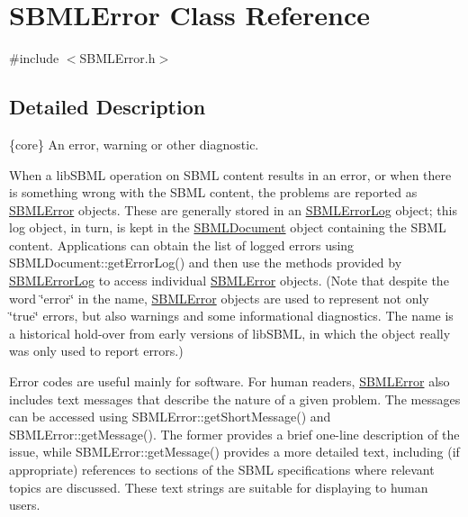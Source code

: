 \hypertarget{class_s_b_m_l_error}{}\section{S\+B\+M\+L\+Error Class Reference}
\label{class_s_b_m_l_error}


{\ttfamily \#include $<$S\+B\+M\+L\+Error.\+h$>$}



\subsection{Detailed Description}
\{core\} An error, warning or other diagnostic.



When a lib\+S\+B\+ML operation on S\+B\+ML content results in an error, or when there is something wrong with the S\+B\+ML content, the problems are reported as \hyperlink{class_s_b_m_l_error}{S\+B\+M\+L\+Error} objects. These are generally stored in an \hyperlink{class_s_b_m_l_error_log}{S\+B\+M\+L\+Error\+Log} object; this log object, in turn, is kept in the \hyperlink{class_s_b_m_l_document}{S\+B\+M\+L\+Document} object containing the S\+B\+ML content. Applications can obtain the list of logged errors using S\+B\+M\+L\+Document\+::get\+Error\+Log() and then use the methods provided by \hyperlink{class_s_b_m_l_error_log}{S\+B\+M\+L\+Error\+Log} to access individual \hyperlink{class_s_b_m_l_error}{S\+B\+M\+L\+Error} objects. (Note that despite the word \char`\"{}error\char`\"{} in the name, \hyperlink{class_s_b_m_l_error}{S\+B\+M\+L\+Error} objects are used to represent not only \char`\"{}true\char`\"{} errors, but also warnings and some informational diagnostics. The name is a historical hold-\/over from early versions of lib\+S\+B\+ML, in which the object really was only used to report errors.)

Error codes are useful mainly for software. For human readers, \hyperlink{class_s_b_m_l_error}{S\+B\+M\+L\+Error} also includes text messages that describe the nature of a given problem. The messages can be accessed using S\+B\+M\+L\+Error\+::get\+Short\+Message() and S\+B\+M\+L\+Error\+::get\+Message(). The former provides a brief one-\/line description of the issue, while S\+B\+M\+L\+Error\+::get\+Message() provides a more detailed text, including (if appropriate) references to sections of the S\+B\+ML specifications where relevant topics are discussed. These text strings are suitable for displaying to human users.

